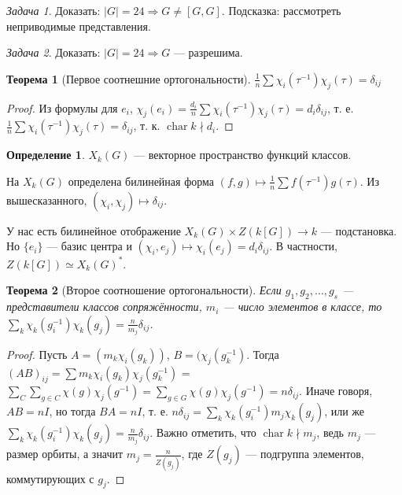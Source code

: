 \documentclass{article}
\newtheorem*{theorem}{Теорема}
\theoremstyle{definition}
\newtheorem*{definition}{Определение}
\theoremstyle{remark}
\newtheorem{prb}{Задача}
\newenvironment{problem}
{\begin{prb}
\label{\theprb}}
{\end{prb}}
\DeclareMathOperator{\chr}{char}
\newcommand{\Ra}{\Rightarrow}
\begin{document}
\begin{problem}
    Доказать: $|G| = 24 \Ra G \neq [G, G]$. Подсказка: рассмотреть неприводимые представления.
\end{problem}
\begin{problem}
    Доказать: $|G| = 24 \Ra G$ --- разрешима.
\end{problem}

\begin{theorem}[Первое соотнешние ортогональности]
$\frac{1}{n}\sum \chi_i(\tau^{-1}) \chi_j(\tau) = \delta_{ij}$
\end{theorem}
\begin{proof}
Из формулы для $e_i$,
$\chi_j(e_i) = \frac{d_i}{n} \sum \chi_i(\tau^{-1}) \chi_j(\tau) = d_i \delta_{ij}$, т. е.
$\frac{1}{n}\sum \chi_i(\tau^{-1}) \chi_j(\tau) = \delta_{ij}$, т. к. $\chr k \nmid d_i$.
\end{proof}

\begin{definition}
	$X_k(G)$ --- векторное пространство функций классов.
\end{definition}

На $X_k(G)$ определена билинейная форма $(f, g) \mapsto \frac{1}{n} \sum f(\tau^{-1}) g(\tau)$. Из вышесказанного, $(\chi_i, \chi_j) \mapsto \delta_{ij}$.

У нас есть билинейное отображение $X_k(G) \times Z(k[G]) \rightarrow k$ --- подстановка. Но $\{e_i\}$ --- базис центра и $(\chi_i, e_j) \mapsto \chi_i(e_j) = d_i \delta_{ij}$. В частности, $Z(k[G]) \simeq X_k(G)^*$.

\begin{theorem}[Второе соотношение ортогональности]
Если $g_1, g_2, \ldots, g_s$ --- представители классов сопряжённости, $m_i$ --- число элементов в классе, то $\sum_k \chi_k(g_i^{-1}) \chi_k(g_j) = \frac{n}{m_j}\delta_{ij}$.
\end{theorem}
\begin{proof}
	Пусть $A = (m_k \chi_i(g_k))$, $B = (\chi_j(g_k^{-1})$. Тогда $(AB)_{ij} = \sum m_k \chi_i(g_k) \chi_j(g_k^{-1})$ = $\sum_C \sum_{g \in C} \chi(g) \chi_j(g^{-1}) = \sum_{g \in G} \chi(g) \chi_j(g^{-1}) = n\delta_{ij}$. Иначе говоря, $AB = nI$, но тогда $BA = nI$, т. е. $n\delta_{ij} = \sum_k \chi_k(g_i^{-1}) m_j \chi_k(g_j)$, или же $\sum_k \chi_k(g_i^{-1}) \chi_k(g_j) = \frac{n}{m_j}\delta_{ij}$. Важно отметить, что $\chr k \nmid m_j$, ведь $m_j$ --- размер орбиты, а значит $m_j = \frac{n}{Z(g_j)}$, где $Z(g_j)$ --- подгруппа элементов, коммутирующих с $g_j$.
\end{proof}
\end{document}
